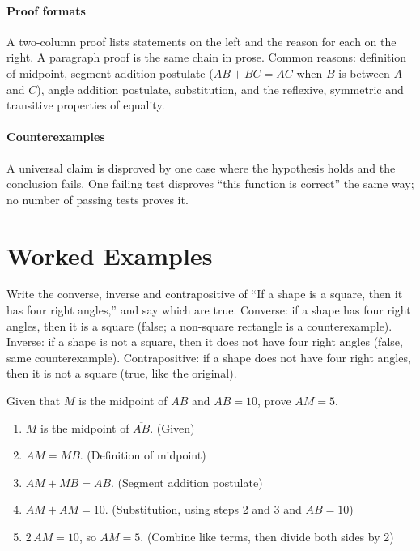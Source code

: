 \paragraph{Proof formats} A two-column proof lists statements on the left and the reason for each on the right. A paragraph proof is the same chain in prose. Common reasons: definition of midpoint, segment addition postulate ($AB + BC = AC$ when $B$ is between $A$ and $C$), angle addition postulate, substitution, and the reflexive, symmetric and transitive properties of equality.

\paragraph{Counterexamples} A universal claim is disproved by one case where the hypothesis holds and the conclusion fails. One failing test disproves ``this function is correct'' the same way; no number of passing tests proves it.

\section{Worked Examples}

\begin{example}
Write the converse, inverse and contrapositive of ``If a shape is a square, then it has four right angles,'' and say which are true.
\solution Converse: if a shape has four right angles, then it is a square (false; a non-square rectangle is a counterexample). Inverse: if a shape is not a square, then it does not have four right angles (false, same counterexample). Contrapositive: if a shape does not have four right angles, then it is not a square (true, like the original).
\end{example}

\begin{example}
Given that $M$ is the midpoint of $\overline{AB}$ and $AB = 10$, prove $AM = 5$.
\solution
\begin{enumerate}[label=\arabic*.,leftmargin=2em]
\item $M$ is the midpoint of $\overline{AB}$. (Given)
\item $AM = MB$. (Definition of midpoint)
\item $AM + MB = AB$. (Segment addition postulate)
\item $AM + AM = 10$. (Substitution, using steps 2 and 3 and $AB = 10$)
\item $2\,AM = 10$, so $AM = 5$. (Combine like terms, then divide both sides by 2)
\end{enumerate}
\end{example}

